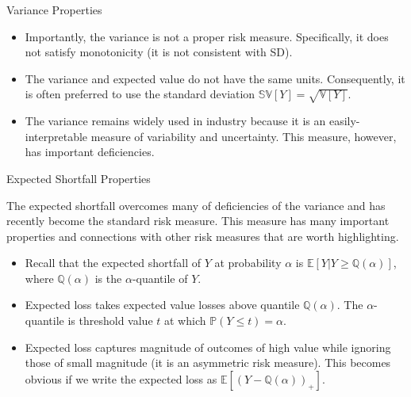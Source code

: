 \documentclass[9pt]{beamer}
\begin{document}
%
\begin{frame}{Variance Properties}

\begin{itemize}
\setlength{\itemsep}{10pt}
\item Importantly, the variance is not a proper risk measure. Specifically, it does not satisfy monotonicity (it is not consistent with SD). 

\item The variance and expected value do not have the same units. Consequently, it is often preferred to use the standard deviation $\mathbb{SV}[Y]=\sqrt{\mathbb{V}[Y]}$. 

\item The variance remains widely used in industry because it is an easily-interpretable measure of variability and uncertainty. This measure, however, has important deficiencies. 

\end{itemize}


\end{frame}

%
\begin{frame}{Expected Shortfall Properties}


The expected shortfall overcomes many of deficiencies of the variance and has recently become the standard risk measure.  This measure has many important properties and connections with other risk measures that are worth highlighting.  

\begin{itemize}
\setlength{\itemsep}{10pt}
\item Recall that the expected shortfall of $Y$ at probability $\alpha$ is $\mathbb{E}[Y|Y\geq \mathbb{Q}(\alpha)]$, where $\mathbb{Q}(\alpha)$ is the $\alpha$-quantile of $Y$. 

\item Expected loss takes expected value losses above quantile $\mathbb{Q}(\alpha)$. The  $\alpha$-quantile is threshold value $t$ at which $\mathbb{P}(Y\leq t)=\alpha$. 

\item Expected loss captures magnitude of outcomes of high value while ignoring those of small magnitude (it is an asymmetric risk measure). This becomes obvious if we write the expected loss as $\mathbb{E}[(Y-\mathbb{Q}(\alpha))_+]$. 

\end{itemize}



\end{frame}
\end{document}
